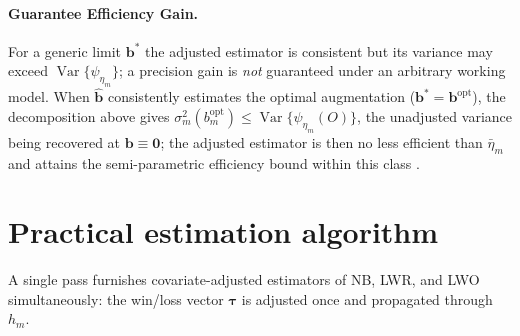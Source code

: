 \documentclass[11pt,a4paper]{article}
\newcommand{\Var}{\operatorname{Var}}
\begin{document}
\paragraph{Guarantee Efficiency Gain.}
For a generic limit $\boldsymbol b^\ast$ the adjusted estimator is consistent but its
variance may exceed $\Var\{\psi_{\eta_m}\}$; a precision gain is \emph{not} guaranteed under
an arbitrary working model. When $\hat{\boldsymbol b}$ consistently estimates the optimal
augmentation ($\boldsymbol b^\ast=\boldsymbol b^{\mathrm{opt}}$), the decomposition above
gives $\sigma_m^2(b_m^{\mathrm{opt}})\le\Var\{\psi_{\eta_m}(O)\}$, the unadjusted variance
being recovered at $\boldsymbol b\equiv\boldsymbol 0$; the adjusted estimator is then no
less efficient than $\bar\eta_m$ and attains the semi-parametric efficiency bound within
this class \citep{tsiatis2008covariate, vermeulen2015increasing}.

\section{Practical estimation algorithm}\label{sec:algorithm}

A single pass furnishes covariate-adjusted estimators of NB, LWR, and LWO
simultaneously: the win/loss vector $\boldsymbol\tau$ is adjusted once and propagated
through $h_m$.
\end{document}
